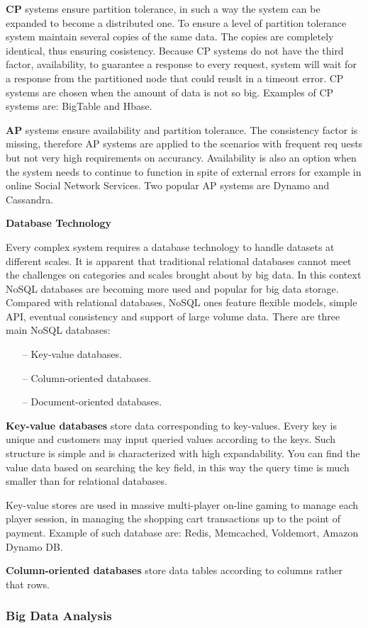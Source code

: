 \textbf{CP} systems ensure partition tolerance, in such a way the system can be expanded to become a distributed one. To ensure a level of partition tolerance system maintain several copies of the same data. The copies are completely identical, thus ensuring cosistency. Because CP systems do not have the third factor, availability, to guarantee a response to every request, system will wait for a response from the partitioned node that could reuslt in a timeout error. CP systems are chosen when the amount of data is not so big. Examples of CP systems are: BigTable and Hbase.

\textbf{AP} systems ensure availability and partition tolerance. The consistency factor is missing, therefore AP systems are applied to the scenarios with frequent req
uests but not very high requirements on accurancy. Availability is also an option when the system needs to continue to function in spite of external errors\cite{AP} for example in online Social Network Services. Two popular AP systems are Dynamo and Cassandra. 

\textbf{Database Technology}

Every complex system requires a database technology to handle datasets at different scales. It is apparent that traditional relational databases cannot meet the challenges on categories and scales brought about by big data. In this context NoSQL databases are becoming more used and popular for big data storage. Compared with relational databases, NoSQL ones feature flexible models, simple API, eventual consistency and support of large volume data. There are three main NoSQL databases:
 
\begin{itemize}
\item[--] Key-value databases.
\item[--] Column-oriented databases.
\item[--] Document-oriented databases.
\end{itemize} 

\textbf{Key-value databases} store data corresponding to key-values. Every key is unique and customers may input queried values according to the keys. Such structure is simple and is characterized with high expandability. You can find the value data based on searching the key field, in this way the query time is much smaller than for relational databases.

Key-value stores are used in massive multi-player on-line gaming to manage each player session, in managing the shopping cart transactions up to the point of payment. Example of such database are: Redis, Memcached, Voldemort, Amazon Dynamo DB.

\textbf{Column-oriented databases} store data tables according to columns rather that rows. 















\subsubsection{Big Data Analysis}

